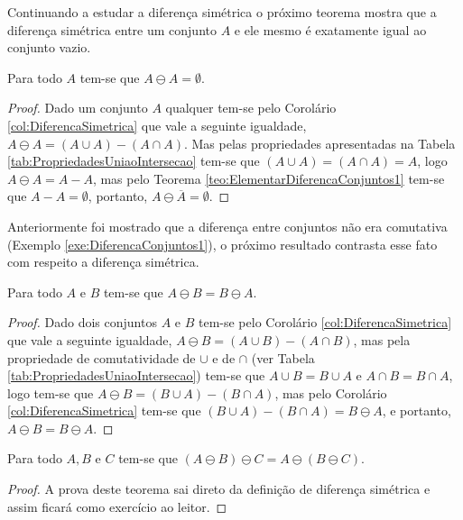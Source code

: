 Continuando a estudar a diferença simétrica o próximo teorema mostra que a diferença simétrica entre um conjunto $A$ e ele mesmo é exatamente igual ao conjunto vazio.

\begin{theorem}
	Para todo $A$ tem-se que $A \ominus A = \emptyset$.
\end{theorem}

\begin{proof}
	Dado um conjunto $A$ qualquer tem-se pelo Corolário \ref{col:DiferencaSimetrica} que vale a seguinte igualdade,  $A \ominus A = (A \cup A) - (A \cap A)$. Mas pelas propriedades apresentadas na Tabela \ref{tab:PropriedadesUniaoIntersecao} tem-se que $(A \cup A) = (A \cap A) = A$, logo $A \ominus A =  A - A$, mas pelo Teorema \ref{teo:ElementarDiferencaConjuntos1} tem-se que $A - A = \emptyset$, portanto, $A \ominus \overline{A} = \emptyset$.
\end{proof}

Anteriormente foi mostrado que a diferença entre conjuntos não era comutativa (Exemplo \ref{exe:DiferencaConjuntos1}), o próximo resultado contrasta esse fato com respeito a diferença simétrica.

\begin{theorem}
	Para todo $A$ e $B$ tem-se que $A \ominus B = B \ominus A$.
\end{theorem}

\begin{proof}
	Dado dois conjuntos $A$ e $B$ tem-se pelo Corolário \ref{col:DiferencaSimetrica} que vale a seguinte igualdade,  $A \ominus B = (A \cup B) - (A \cap B)$, mas pela propriedade de comutatividade de $\cup$ e de $\cap$ (ver Tabela \ref{tab:PropriedadesUniaoIntersecao}) tem-se que $A \cup B = B \cup A$ e $A \cap B = B \cap A$, logo tem-se que $A \ominus B = (B \cup A) - (B \cap A)$, mas pelo Corolário \ref{col:DiferencaSimetrica} tem-se que $(B \cup A) - (B \cap A) = B \ominus A$, e portanto, $A \ominus B = B \ominus A$.
\end{proof}

\begin{theorem}
	Para todo $A, B$ e $C$ tem-se que $(A \ominus B) \ominus C = A \ominus (B \ominus C)$.
\end{theorem}

\begin{proof}
	A prova deste teorema sai direto da definição de diferença simétrica e assim ficará como exercício ao leitor.
\end{proof}

